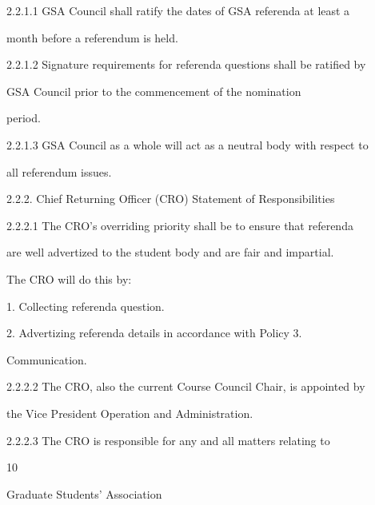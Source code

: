   

2.2.1.1         GSA  Council  shall  ratify  the  dates  of  GSA  referenda  at  least  a  

                month before a referendum is held.   

  

2.2.1.2         Signature requirements for referenda questions shall be ratified by  

                GSA  Council  prior  to  the  commencement  of  the  nomination  

                period.   

  

2.2.1.3         GSA Council as a whole will act as a neutral body with respect to  

                all referendum issues.   

  

2.2.2. Chief Returning Officer (CRO) Statement of Responsibilities  

  

2.2.2.1         The  CRO’s  overriding  priority  shall  be  to  ensure  that  referenda  

                are well advertized to the student body and are fair and impartial.  

                The CRO will do this by:   

  

     1.  Collecting referenda question.   

     2.  Advertizing          referenda         details      in    accordance          with      Policy        3.  

          Communication.   

  

2.2.2.2         The CRO, also the current Course Council Chair, is appointed by  

                the Vice President Operation and Administration.   

  

2.2.2.3         The  CRO  is  responsible  for  any  and  all  matters  relating  to  



                                                         10  

                                                                                                                   

                                 Graduate Students’ Association  

